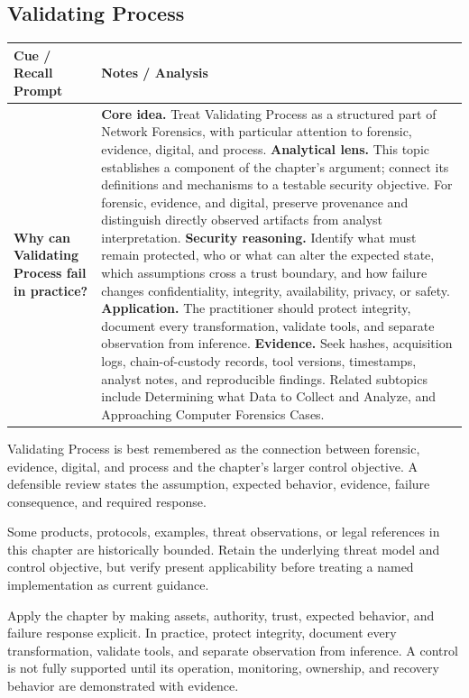 \documentclass[11pt]{article}
\newcommand{\CornellHeader}{%
\rowcolor{Navy}\color{white}\bfseries Cue / Recall Prompt & \color{white}\bfseries Notes / Analysis\\\hline}
\newcommand{\CornellRow}[2]{%
\cellcolor{CueGray}\RaggedRight\textbf{#1} & \RaggedRight #2\\\hline}
\begin{document}
\subsection*{Validating Process}
\begin{longtable}{>{\RaggedRight\arraybackslash}p{}|>{\RaggedRight\arraybackslash}p{}}
\CornellHeader
\CornellRow{Why can Validating Process fail in practice?}{\textbf{Core idea.} Treat Validating Process as a structured part of Network Forensics, with particular attention to forensic, evidence, digital, and process. \textbf{Analytical lens.} This topic establishes a component of the chapter's argument; connect its definitions and mechanisms to a testable security objective. For forensic, evidence, and digital, preserve provenance and distinguish directly observed artifacts from analyst interpretation. \textbf{Security reasoning.} Identify what must remain protected, who or what can alter the expected state, which assumptions cross a trust boundary, and how failure changes confidentiality, integrity, availability, privacy, or safety. \textbf{Application.} The practitioner should protect integrity, document every transformation, validate tools, and separate observation from inference. \textbf{Evidence.} Seek hashes, acquisition logs, chain-of-custody records, tool versions, timestamps, analyst notes, and reproducible findings. Related subtopics include Determining what Data to Collect and Analyze, and Approaching Computer Forensics Cases.}
\end{longtable}
\begin{topicsummary}
Validating Process is best remembered as the connection between forensic, evidence, digital, and process and the chapter's larger control objective. A defensible review states the assumption, expected behavior, evidence, failure consequence, and required response.
\end{topicsummary}
\begin{historybox}
Some products, protocols, examples, threat observations, or legal references in this chapter are historically bounded. Retain the underlying threat model and control objective, but verify present applicability before treating a named implementation as current guidance.
\end{historybox}
\begin{defensebox}
Apply the chapter by making assets, authority, trust, expected behavior, and failure response explicit. In practice, protect integrity, document every transformation, validate tools, and separate observation from inference. A control is not fully supported until its operation, monitoring, ownership, and recovery behavior are demonstrated with evidence.
\end{defensebox}
\end{document}
